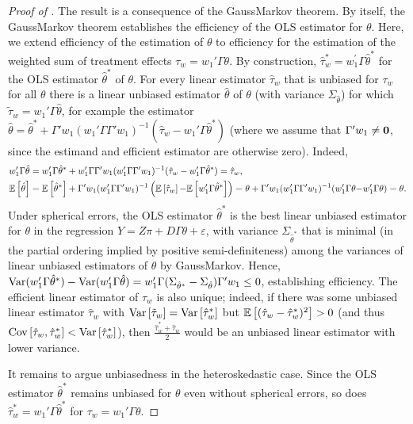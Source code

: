 \documentclass[english,11pt]{article}
\theoremstyle{plain}
\theoremstyle{plain}
\theoremstyle{plain}
\theoremstyle{plain}
\let\ref\Cref
\begin{document}
\begin{proof}[Proof of \ref{thm:OLS-BLUE}]
The result is a consequence of the Gauss\textendash Markov theorem.
By itself, the Gauss\textendash Markov theorem establishes the efficiency
of the OLS estimator for $\theta$. Here, we extend efficiency of
the estimation of $\theta$ to efficiency for the estimation of the
weighted sum of treatment effects $\tau_{w}=w_{1}'\Gamma\theta$.
By construction, $\hat{\tau}_{w}^{*}=w_{1}^{\prime}\Gamma\hat{\theta}^{*}$
for the OLS estimator $\hat{\theta}^{*}$ of $\theta$. For every
linear estimator $\hat{\tau}_{w}$ that is unbiased for $\tau_{w}$
for all $\theta$ there is a linear unbiased estimator $\hat{\theta}$
of $\theta$ (with variance $\Sigma_{\hat{\theta}}$) for which $\tilde{\tau}_{w}=w_{1}'\Gamma\hat{\theta}$,
for example the estimator $\hat{\theta}=\hat{\theta}^{*}+\Gamma'w_{1}(w_{1}'\Gamma\Gamma'w_{1})^{-1}(\hat{\tau}_{w}-w_{1}'\Gamma\hat{\theta}^{*})$
(where we assume that $\Gamma'w_{1}\neq\textbf{0}$, since the estimand and
efficient estimator are otherwise zero). Indeed, 
\begin{align*}
w_{1}'\Gamma\hat{\theta} & =w_{1}'\Gamma\hat{\theta}^{*}+w_{1}'\Gamma\Gamma'w_{1}(w_{1}'\Gamma\Gamma'w_{1})^{-1}(\hat{\tau}_{w}-w_{1}'\Gamma\hat{\theta}^{*})=\hat{\tau}_{w},\\
\mathbb{E}\left[\hat{\theta}\right] & =\mathbb{E}\left[\hat{\theta}^{*}\right]+\Gamma'w_{1}(w_{1}'\Gamma\Gamma'w_{1})^{-1}\left(\mathbb{E}\left[\hat{\tau}_{w}\right]{-}\mathbb{E}\left[w_{1}'\Gamma\hat{\theta}^{*}\right]\right)=\theta+\Gamma'w_{1}(w_{1}'\Gamma\Gamma'w_{1})^{-1}(w_{1}'\Gamma\theta{-}w_{1}'\Gamma\theta)=\theta.
\end{align*}
Under spherical errors, the OLS estimator $\hat{\theta}^{*}$ is the
best linear unbiased estimator for $\theta$ in the regression $Y=Z\pi+D\Gamma\theta+\varepsilon$,
with variance $\Sigma_{\hat{\theta}^{*}}$ that is minimal (in the
partial ordering implied by positive semi-definiteness) among the
variances of linear unbiased estimators of $\theta$ by Gauss\textendash Markov.
Hence, $\mathrm{Var}(w_{1}^{\prime}\Gamma\hat{\theta}^{*})-\mathrm{Var}(w_{1}^{\prime}\Gamma\hat{\theta})=w_{1}'\Gamma(\Sigma_{\hat{\theta}^{*}}-\Sigma_{\hat{\theta}})\Gamma'w_{1}\leq0$,
establishing efficiency. The efficient linear estimator of $\tau_{w}$
is also unique; indeed, if there was some unbiased linear estimator
$\hat{\tau}_{w}$ with $\mathrm{Var}\left[\tilde{\tau}_{w}\right]=\mathrm{Var}\left[\hat{\tau}_{w}^{*}\right]$
but $\mathbb{E}\left[(\hat{\tau}_{w}-\hat{\tau}_{w}^{\ast})^{2}\right]>0$ (and thus
$\mathrm{Cov}\left[\hat{\tau}_{w},\hat{\tau}_{w}^{\ast}\right]<\mathrm{Var}\left[\hat{\tau}_{w}^{\ast}\right]$),
then $\frac{\hat{\tau}_{w}^{*}+\hat{\tau}_{w}}{2}$ would be an unbiased
linear estimator with lower variance.

It remains to argue unbiasedness in the heteroskedastic case. Since
the OLS estimator $\hat{\theta}^{*}$ remains unbiased for $\theta$
even without spherical errors, so does $\hat{\tau}_{w}^{*}=w_{1}'\Gamma\hat{\theta}^{*}$
for $\tau_{w}=w_{1}'\Gamma\theta$.
\end{proof}
\end{document}
